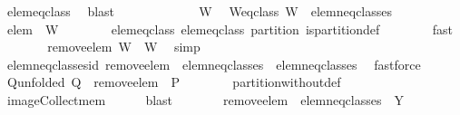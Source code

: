 \begin{isabellebody}
\ elem{\isacharunderscore}eq{\isacharunderscore}class{\isacharprime}\ \isamarkupfalse%
\ blast\isanewline
\ \ \isanewline
\ \ \isacommand{{\isacharbraceleft}}\isamarkupfalse%
\ \isanewline
\ \ \ \ \isamarkupfalse%
\ W\ \isamarkupfalse%
\ W{\isacharunderscore}eq{\isacharunderscore}class{\isacharcolon}\ {\isachardoublequoteopen}W\ {\isasymin}\ {\isacharquery}elem{\isacharunderscore}neq{\isacharunderscore}classes{\isachardoublequoteclose}\isanewline
\ \ \ \ \isamarkupfalse%
\ \isamarkupfalse%
\ {\isachardoublequoteopen}elem\ {\isasymnotin}\ W{\isachardoublequoteclose}\isanewline
\ \ \ \ \ \ \isamarkupfalse%
\ elem{\isacharunderscore}eq{\isacharunderscore}class\ elem{\isacharunderscore}eq{\isacharunderscore}class{\isacharprime}\ partition\ is{\isacharunderscore}partition{\isacharunderscore}def\isanewline
\ \ \ \ \ \ \isamarkupfalse%
\ fast\isanewline
\ \ \ \ \isamarkupfalse%
\ \isamarkupfalse%
\ {\isachardoublequoteopen}{\isacharquery}remove{\isacharunderscore}elem\ W\ {\isacharequal}\ W{\isachardoublequoteclose}\ \isamarkupfalse%
\ simp\isanewline
\ \ \isacommand{{\isacharbraceright}}\isamarkupfalse%
\isanewline
\ \ \isamarkupfalse%
\ \isamarkupfalse%
\ elem{\isacharunderscore}neq{\isacharunderscore}classes{\isacharunderscore}id{\isacharcolon}\ {\isachardoublequoteopen}{\isacharquery}remove{\isacharunderscore}elem\ {\isacharbackquote}\ {\isacharquery}elem{\isacharunderscore}neq{\isacharunderscore}classes\ {\isacharequal}\ {\isacharquery}elem{\isacharunderscore}neq{\isacharunderscore}classes{\isachardoublequoteclose}\ \isamarkupfalse%
\ fastforce\isanewline
\isanewline
\ \ \isamarkupfalse%
\ Q{\isacharunderscore}unfolded{\isacharcolon}\ {\isachardoublequoteopen}{\isacharquery}Q\ {\isacharequal}\ {\isacharquery}remove{\isacharunderscore}elem\ {\isacharbackquote}\ P\ {\isacharminus}\ {\isacharbraceleft}{\isacharbraceleft}{\isacharbraceright}{\isacharbraceright}{\isachardoublequoteclose}\isanewline
\ \ \ \ \isamarkupfalse%
\ partition{\isacharunderscore}without{\isacharunderscore}def\isanewline
\ \ \ \ \isamarkupfalse%
\ image{\isacharunderscore}Collect{\isacharunderscore}mem\isanewline
\ \ \ \ \isamarkupfalse%
\ blast\isanewline
\ \ \isamarkupfalse%
\ \isamarkupfalse%
\ {\isachardoublequoteopen}{\isasymdots}\ {\isacharequal}\ {\isacharquery}remove{\isacharunderscore}elem\ {\isacharbackquote}\ {\isacharparenleft}{\isacharquery}elem{\isacharunderscore}neq{\isacharunderscore}classes\ {\isasymunion}\ {\isacharbraceleft}Y{\isacharbraceright}{\isacharparenright}\ {\isacharminus}\ {\isacharbraceleft}{\isacharbraceleft}{\isacharbraceright}{\isacharbraceright}{\isachardoublequoteclose}\ \isamarkupfalse%

\end{isabellebody}
